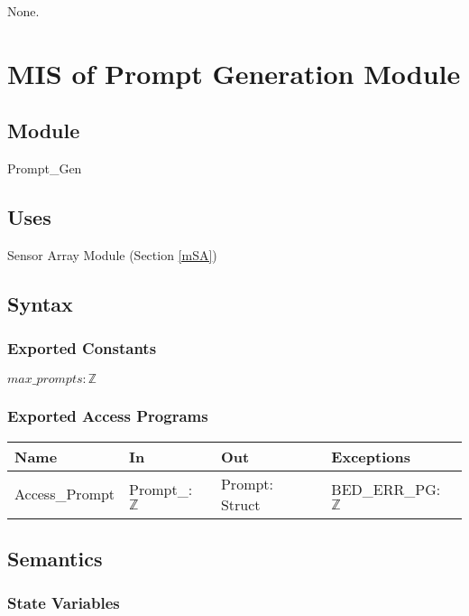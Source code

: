 \documentclass[12pt, titlepage]{article}
\begin{document}
None.

\newpage




\section{MIS of Prompt Generation Module} \label{mPG} 

\subsection{Module}

Prompt\_Gen

\subsection{Uses}

Sensor Array Module (Section \ref{mSA})

\subsection{Syntax}

\subsubsection{Exported Constants}

$max\_prompts: \mathbb{Z}$

\subsubsection{Exported Access Programs}

\begin{center}
\begin{tabular}{p{3cm} p{3cm} p{4cm} p{2cm}}
\hline
\textbf{Name} & \textbf{In} & \textbf{Out} & \textbf{Exceptions} \\
\hline
Access\_Prompt & Prompt\_: $\mathbb{Z}$ & Prompt: Struct & BED\_ERR\_PG: $\mathbb{Z}$ \\
\hline
\end{tabular}
\end{center}

\subsection{Semantics}

\subsubsection{State Variables}
\end{document}
